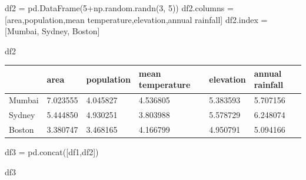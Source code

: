 \documentclass[
  letterpaper,
  DIV=11,
  numbers=noendperiod]{scrreprt}
\newenvironment{Shaded}{\begin{snugshade}}{\end{snugshade}}
\newcommand{\DecValTok}[1]{\textcolor[rgb]{0.68,0.00,0.00}{#1}}
\newcommand{\NormalTok}[1]{\textcolor[rgb]{0.00,0.23,0.31}{#1}}
\newcommand{\OperatorTok}[1]{\textcolor[rgb]{0.37,0.37,0.37}{#1}}
\newcommand{\StringTok}[1]{\textcolor[rgb]{0.13,0.47,0.30}{#1}}
\begin{document}
\begin{Shaded}
\begin{Highlighting}[]
\NormalTok{df2 }\OperatorTok{=}\NormalTok{ pd.DataFrame(}\DecValTok{5}\OperatorTok{+}\NormalTok{np.random.randn(}\DecValTok{3}\NormalTok{, }\DecValTok{5}\NormalTok{))}
\NormalTok{df2.columns }\OperatorTok{=}\NormalTok{ [}\StringTok{\textquotesingle{}area\textquotesingle{}}\NormalTok{,}\StringTok{\textquotesingle{}population\textquotesingle{}}\NormalTok{,}\StringTok{\textquotesingle{}mean temperature\textquotesingle{}}\NormalTok{,}\StringTok{\textquotesingle{}elevation\textquotesingle{}}\NormalTok{,}\StringTok{\textquotesingle{}annual rainfall\textquotesingle{}}\NormalTok{]}
\NormalTok{df2.index }\OperatorTok{=}\NormalTok{ [}\StringTok{\textquotesingle{}Mumbai\textquotesingle{}}\NormalTok{, }\StringTok{\textquotesingle{}Sydney\textquotesingle{}}\NormalTok{, }\StringTok{\textquotesingle{}Boston\textquotesingle{}}\NormalTok{]}
\end{Highlighting}
\end{Shaded}

\begin{Shaded}
\begin{Highlighting}[]
\NormalTok{df2}
\end{Highlighting}
\end{Shaded}

\begin{longtable}[]{@{}llllll@{}}
\toprule\noalign{}
& area & population & mean temperature & elevation & annual rainfall \\
\midrule\noalign{}
\endhead
\bottomrule\noalign{}
\endlastfoot
Mumbai & 7.023555 & 4.045827 & 4.536805 & 5.383593 & 5.707156 \\
Sydney & 5.444850 & 4.930251 & 3.803988 & 5.578729 & 6.248074 \\
Boston & 3.380747 & 3.468165 & 4.166799 & 4.950791 & 5.094166 \\
\end{longtable}

\begin{Shaded}
\begin{Highlighting}[]
\NormalTok{df3 }\OperatorTok{=}\NormalTok{ pd.concat([df1,df2])}
\end{Highlighting}
\end{Shaded}

\begin{Shaded}
\begin{Highlighting}[]
\NormalTok{df3}
\end{Highlighting}
\end{Shaded}
\end{document}
